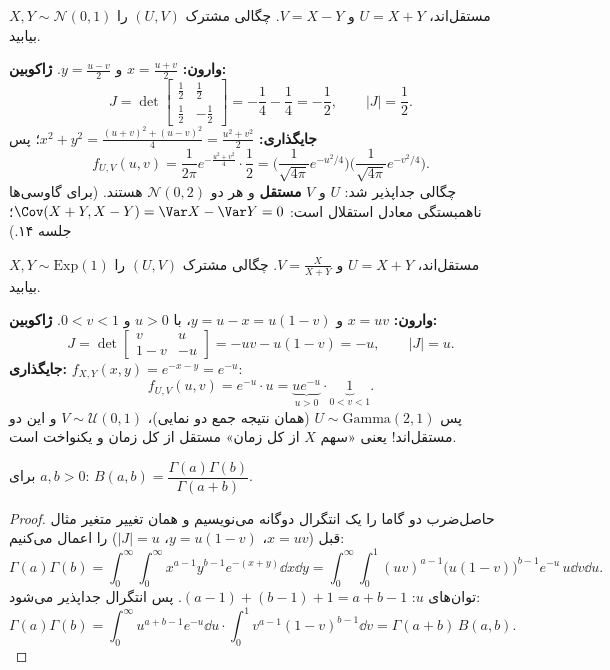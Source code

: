 \begin{example}
$X,Y\sim\mathcal N(0,1)$ مستقل‌اند، $U=X+Y$ و $V=X-Y$. چگالی مشترک $(U,V)$ را بیابید.
\begin{solution}
\textbf{وارون:} $x=\frac{u+v}{2}$ و $y=\frac{u-v}{2}$.
\textbf{ژاکوبین:}
\[
J=\det\begin{bmatrix}\frac12&\frac12\\[1mm]\frac12&-\frac12\end{bmatrix}=-\frac14-\frac14=-\frac12,\qquad|J|=\frac12 .
\]
\textbf{جایگذاری:} $x^2+y^2=\frac{(u+v)^2+(u-v)^2}{4}=\frac{u^2+v^2}{2}$؛ پس
\[
f_{U,V}(u,v)=\frac{1}{2\pi}e^{-\frac{u^2+v^2}{4}}\cdot\frac12=\Big(\frac{1}{\sqrt{4\pi}}e^{-u^2/4}\Big)\Big(\frac{1}{\sqrt{4\pi}}e^{-v^2/4}\Big).
\]
چگالی جداپذیر شد: $U$ و $V$ \textbf{مستقل} و هر دو $\mathcal N(0,2)$ هستند. (برای گاوسی‌ها ناهمبستگی معادل استقلال است: $\Cov(X+Y,X-Y)=\Var X-\Var Y=0$؛ جلسه ۱۴.)
\end{solution}
\end{example}

\begin{example}
$X,Y\sim\mathrm{Exp}(1)$ مستقل‌اند، $U=X+Y$ و $V=\frac{X}{X+Y}$. چگالی مشترک $(U,V)$ را بیابید.
\begin{solution}
\textbf{وارون:} $x=uv$ و $y=u-x=u(1-v)$، با $u>0$ و $0<v<1$.
\textbf{ژاکوبین:}
\[
J=\det\begin{bmatrix}v&u\\1-v&-u\end{bmatrix}=-uv-u(1-v)=-u,\qquad|J|=u .
\]
\textbf{جایگذاری:} $f_{X,Y}(x,y)=e^{-x-y}=e^{-u}$:
\[
f_{U,V}(u,v)=e^{-u}\cdot u=\underbrace{ue^{-u}}_{u>0}\cdot\underbrace{1}_{0<v<1}.
\]
پس $U\sim\mathrm{Gamma}(2,1)$ (همان نتیجه جمع دو نمایی)، $V\sim\mathcal U(0,1)$ و این دو مستقل‌اند! یعنی «سهم $X$ از کل زمان» مستقل از کل زمان و یکنواخت است.
\end{solution}
\end{example}

\begin{theorem}
برای $a,b>0$: $B(a,b)=\dfrac{\Gamma(a)\Gamma(b)}{\Gamma(a+b)}$.
\end{theorem}
\begin{proof}
حاصل‌ضرب دو گاما را یک انتگرال دوگانه می‌نویسیم و همان تغییر متغیر مثال قبل ($x=uv$، $y=u(1-v)$، $|J|=u$) را اعمال می‌کنیم:
\[
\Gamma(a)\Gamma(b)=\int_0^\infty\!\!\int_0^\infty x^{a-1}y^{b-1}e^{-(x+y)}\dd x\dd y
=\int_0^\infty\!\!\int_0^1(uv)^{a-1}\big(u(1-v)\big)^{b-1}e^{-u}\,u\dd v\dd u .
\]
توان‌های $u$: $(a-1)+(b-1)+1=a+b-1$. پس انتگرال جداپذیر می‌شود:
\[
\Gamma(a)\Gamma(b)=\int_0^\infty u^{a+b-1}e^{-u}\dd u\cdot\int_0^1v^{a-1}(1-v)^{b-1}\dd v=\Gamma(a+b)\,B(a,b).
\]
\end{proof}

